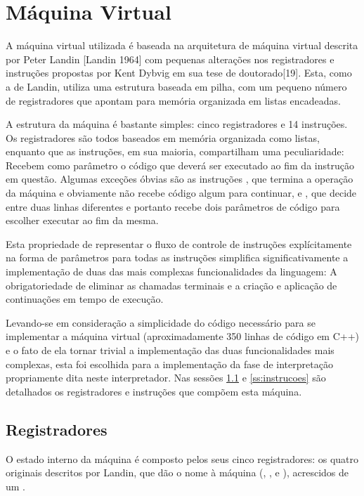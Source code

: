 \section{Máquina Virtual}
\label{sec:maquina-virtual}

A máquina virtual utilizada é baseada na arquitetura de máquina virtual
 descrita por Peter Landin [Landin 1964] com pequenas alterações nos
registradores e instruções propostas por Kent Dybvig em sua tese de
doutorado[19]. Esta, como a de Landin, utiliza uma estrutura baseada em pilha,
com um pequeno número de registradores que apontam para memória organizada em
listas encadeadas. 

A estrutura da máquina é bastante simples: cinco registradores e 14 instruções.
Os registradores são todos baseados em memória organizada como listas, enquanto
que as instruções, em sua maioria, compartilham uma peculiaridade: Recebem como parâmetro
o código que deverá ser executado ao fim da instrução em questão. Algumas
exceções óbvias são as instruções , que termina a operação da
máquina e obviamente não recebe código algum para continuar, e , que
decide entre duas linhas diferentes e portanto recebe dois parâmetros de código
para escolher executar ao fim da mesma.

Esta propriedade de representar o fluxo de controle de instruções
explícitamente na forma de parâmetros para todas as instruções simplifica
significativamente a implementação de duas das mais complexas funcionalidades
da linguagem: A obrigatoriedade de eliminar as chamadas terminais e a criação e
aplicação de continuações em tempo de execução.

Levando-se em consideração a simplicidade do código necessário para se
implementar a máquina virtual  (aproximadamente 350 linhas de código
em C++) e o fato de ela tornar trivial a implementação das duas funcionalidades
mais complexas, esta foi escolhida para a implementação da fase de
interpretação propriamente dita neste interpretador. Nas sessões
\ref{ss:registradores} e \ref{ss:instrucoes} são detalhados os registradores e
instruções que compõem esta máquina.

\subsection{Registradores}
\label{ss:registradores}

O estado interno da máquina é composto pelos seus cinco registradores: os
quatro originais descritos por Landin, que dão o nome à máquina (,
,  e ), acrescidos de um
.

